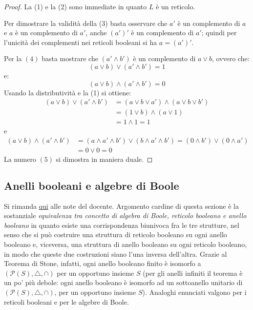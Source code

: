 \begin{proof}	
	La (1) e la (2) sono immediate in quanto $L$ è un reticolo.
	
	Per dimostrare la validità della (3) basta osservare che $a'$ è un complemento di $a$ e $a$ è un complemento di $a'$, anche $(a')'$ è un complemento di $a'$; quindi per l'unicità dei complementi nei reticoli booleani si ha $a=(a')'$.
	
	Per la $(4)$ basta mostrare che $(a' \wedge b')$ è un complemento di $a \vee b$, ovvero che:
	\begin{displaymath}
		(a \vee b) \vee (a' \wedge b') = 1
	\end{displaymath}
	e:
	\begin{displaymath}
		(a \vee b) \wedge (a' \wedge b') = 0
	\end{displaymath}
	Usando la distributività e la (1) si ottiene:
	\begin{align*}
		(a \vee b) \vee (a' \wedge b') &= (a \vee b \vee a') \wedge (a \vee b \vee b') \\
		&= (1 \vee b) \wedge (a \vee 1) \\
		&= 1 \wedge 1 = 1
	\end{align*}
	e
	\begin{align*}
		(a \vee b) \wedge (a' \wedge b') &= (a \wedge a' \wedge b') \vee (b \wedge a' \wedge b') = (0 \wedge b') \vee (0 \wedge a') \\
		&= 0 \vee 0 = 0
	\end{align*}
	La numero $(5)$ si dimostra in maniera duale.
\end{proof}

\subsection{Anelli booleani e algebre di Boole}

Si rimanda \href{https://www.dma.unina.it/cutolo/didattica/note/strutturebooleane.pdf}{qui} alle note del docente. Argomento cardine di questa sezione è la sostanziale \textit{equivalenza tra concetto di algebra di Boole, reticolo booleano e anello booleano} in quanto esiste una corrispondenza biunivoca fra le tre strutture, nel senso che si può costruire una struttura di reticolo booleano su ogni anello booleano e, viceversa, una struttura di anello booleano su ogni reticolo booleano, in modo che queste due
costruzioni siano l’una inversa dell’altra. Grazie al Teorema di Stone, infatti, ogni anello booleano finito è isomorfo a $(\mathcal{P}(S), \triangle, \cap)$ per un opportuno insieme $S$ (per gli anelli infiniti il teorema è un po' più debole: ogni anello booleano è isomorfo ad un sottoanello unitario di $(\mathcal{P}(S), \triangle, \cap)$, per un opportuno insieme $S$). Analoghi enunciati valgono per i reticoli booleani e per le algebre di Boole. 

